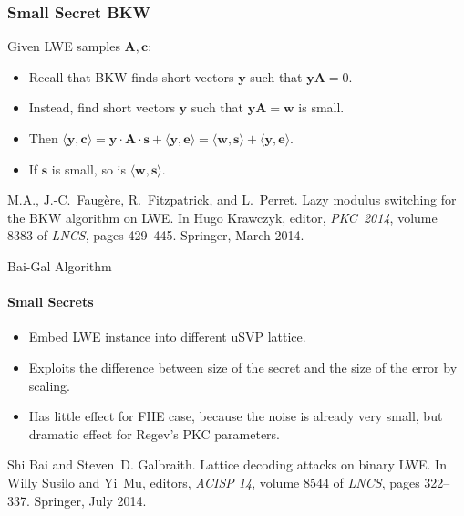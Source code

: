 \documentclass[10pt,compress]{beamer}
\renewcommand{\vec}[1]{\mathbf{#1}\xspace}
\newcommand{\ip}[2]{\langle #1, #2 \rangle}
\renewcommand{\vec}[1]{\mathbf{#1}\xspace}
\begin{document}
\begin{frame}
  \frametitle{Small Secret BKW}
  Given LWE samples $\vec{A}, \vec{c}$:
  \begin{itemize}
  \item Recall that BKW finds short vectors $\vec{y}$ such that $\vec{y}\vec{A} = 0$.
  \item Instead, find short vectors $\vec{y}$ such that $\vec{y}\vec{A} = \vec{w}$ is \alert{small}.
  \item Then $\ip{\vec{y}}{\vec{c}} = \vec{y}\cdot \vec{A} \cdot \vec{s} + \ip{\vec{y}}{\vec{e}} = \ip{\vec{w}}{\vec{s}} + \ip{\vec{y}}{\vec{e}}$.
  \item If $\vec{s}$ is small, so is $\ip{\vec{w}}{\vec{s}}$.
  \end{itemize}

  \begin{thebibliography}{99}
   M.A., J.-C.~Faug{\`e}re, R.~Fitzpatrick, and L.~Perret.
    \newblock Lazy modulus switching for the {BKW} algorithm on {LWE}.
    \newblock In Hugo Krawczyk, editor, {\em PKC~2014}, volume 8383 of {\em
      {LNCS}}, pages 429--445. Springer, March 2014.
  \end{thebibliography}
\end{frame}

\begin{frame}{Bai-Gal Algorithm}
  \framesubtitle{Small Secrets}
  \begin{itemize}
  \item Embed LWE instance into different uSVP lattice.
  \item Exploits the difference between size of the secret and the size of the error by scaling.
  \item Has little effect for FHE case, because the noise is already very small, but dramatic effect for Regev’s PKC parameters.
  \end{itemize}

  \begin{thebibliography}{99}
    Shi Bai and Steven~D. Galbraith.
    \newblock Lattice decoding attacks on binary {LWE}.
    \newblock In Willy Susilo and Yi~Mu, editors, {\em ACISP 14}, volume 8544 of
    {\em {LNCS}}, pages 322--337. Springer, July 2014.
  \end{thebibliography}

\end{frame}
\end{document}
